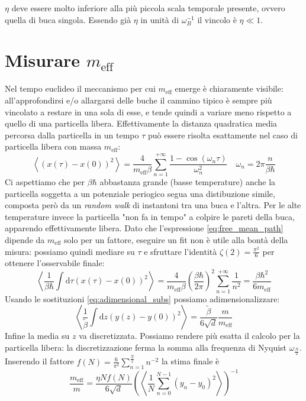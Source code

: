 \documentclass[italian]{article}
\newcommand{\meff}{m_{\mathrm{eff}}}
\newcommand{\diff}{\mathrm{d}}
\begin{document}
    $\eta$ deve essere molto inferiore alla più piccola scala temporale presente, ovvero quella di buca singola. Essendo già $\eta$ in unità di $\omega_B^{-1}$ il vincolo è $\eta \ll 1$.
    
\section{Misurare $\meff$}

    Nel tempo euclideo il meccanismo per cui $\meff$ emerge è chiaramente visibile: all'approfondirsi e/o allargarsi delle buche il cammino tipico è sempre più vincolato a restare in una sola di esse, e tende quindi a variare meno rispetto a quello di una particella libera.
    Effettivamente la distanza quadratica media percorsa dalla particella in un tempo $\tau$ può essere risolta esattamente nel caso di particella libera con massa $\meff$:
    \begin{equation}\label{eq:free_mean_path}
        \left\langle\left(x(\tau) - x(0)\right)^2\right\rangle = \frac{4}{\meff \beta} \sum_{n=1}^{+\infty} \frac{1 - \cos\left(\omega_n \tau\right)}{\omega_n^2} \quad
        \omega_n = 2\pi\frac{n}{\beta \hbar}
    \end{equation}
    Ci aspettiamo che per $\beta \hbar$ abbastanza grande (basse temperature) anche la particella soggetta a un potenziale periogico segua una distibuzione simile, composta però da un \textit{random walk} di instantoni tra una buca e l'altra. Per le alte temperature invece la particella "non fa in tempo" a colpire le pareti della buca, apparendo effettivamente libera.
    Dato che l'espressione \eqref{eq:free_mean_path} dipende da $\meff$ solo per un fattore, eseguire un fit non è utile alla bontà della misura: possiamo quindi mediare su $\tau$ e sfruttare l'identità $\zeta(2)=\frac{\pi^2}{6}$ per ottenere l'osservabile finale:
    \begin{equation}\label{eq:observable}
       \left\langle \frac{1}{\beta \hbar} \int \diff\tau \left(x(\tau) - x(0)\right)^2\right\rangle = \frac{4}{\meff \beta} \left(\frac{\beta \hbar}{2 \pi}\right)^2 \sum_{n=1}^{+\infty} \frac{1}{n^2} = \frac{\beta \hbar^2}{6 \meff}
    \end{equation}
    Usando le sostituzioni \eqref{eq:adimensional_subs} possiamo adimensionalizzare:
    \begin{equation}
       \left\langle \frac{1}{\tilde{\beta}} \int \diff z \left(y(z) - y(0)\right)^2\right\rangle = \frac{\tilde{\beta}}{6 \sqrt{d}} \frac{m}{\meff}
    \end{equation}
    Infine la media su $z$ va discretizzata. Possiamo rendere più esatta il calcolo per la particella libera: la discretizzazione ferma la somma alla frequenza di Nyquist $\omega_{\frac{N}{2}}$. Inserendo il fattore $f(N)=\frac{6}{\pi^2}\sum_{n=1}^{\frac{N}{2}} n^{-2}$ la stima finale è
    \begin{equation}
        \frac{\meff}{m} = \frac{\eta N f(N)}{6 \sqrt{d}} \left(
        \left\langle \frac{1}{N} \sum_{n=0}^{N-1}  \left(y_n - y_0\right)^2\right\rangle 
        \right)^{-1}
    \end{equation}
    
\end{document}
